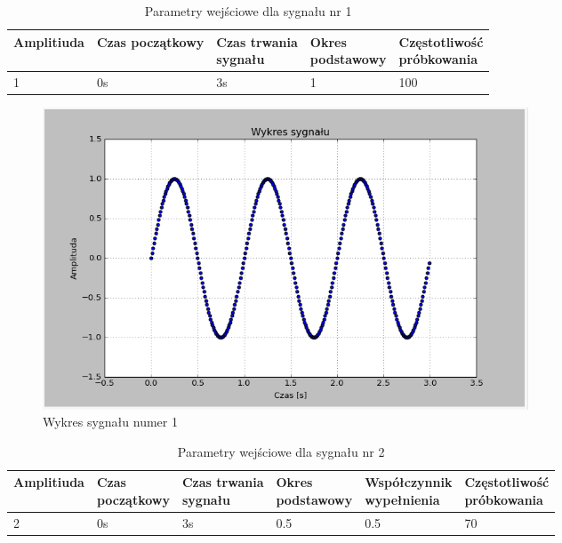 \documentclass{article}
\begin{document}
{{    \begin{table}[h!]
        \centering
        \begin{tabular}{|l|l|l|l|l|}
            \hline
            Amplitiuda & Czas początkowy & \shortstack{Czas trwania \\ sygnału} & \shortstack{Okres \\ podstawowy} & \shortstack{Częstotliwość\\ próbkowania}   \\ \hline
            1 & 0s & 3s & 1 & 100           \\ \hline
        \end{tabular}
        \caption{Parametry wejściowe dla sygnału nr 1}
    \end{table}
    \FloatBarrier
    \begin{figure}[h!]
        \centering
        \includegraphics[width=0.7\textwidth]{img/splot1.png}
        \caption{Wykres sygnału numer 1}
    \end{figure}
    \FloatBarrier
    \begin{table}[h!]
        \centering
        \begin{tabular}{|l|l|l|l|l|l|}
            \hline
            Amplitiuda & \shortstack{Czas \\ początkowy} & \shortstack{Czas trwania \\ sygnału} & \shortstack{Okres \\ podstawowy} & \shortstack{Współczynnik\\ wypełnienia}  & \shortstack{Częstotliwość\\ próbkowania}   \\ \hline
            2 & 0s & 3s & 0.5 & 0.5 & 70           \\ \hline
        \end{tabular}
        \caption{Parametry wejściowe dla sygnału nr 2}
    \end{table}
    \begin{figure}[h!]

\end{figure}}}
\end{document}

